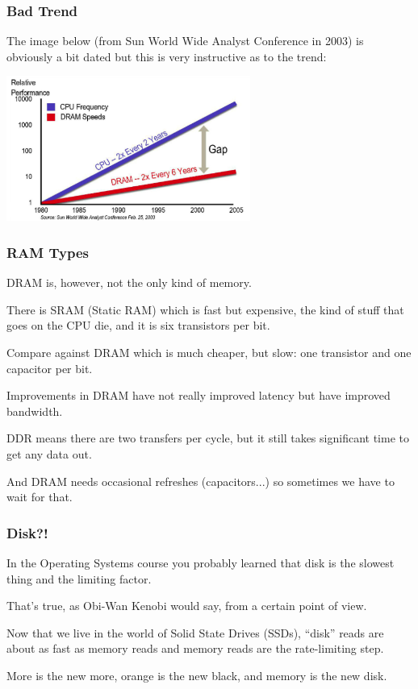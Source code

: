 \begin{frame}
\frametitle{Bad Trend}

The image below (from Sun World Wide Analyst Conference in 2003) is obviously a bit dated but this is very instructive as to the trend:
\begin{center}
\includegraphics[width=0.6\textwidth]{images/ram-vs-cpu.png}
\end{center}

\end{frame}



\begin{frame}
\frametitle{RAM Types}

DRAM is, however, not the only kind of memory. 

There is SRAM (Static RAM) which is fast but expensive, the kind of stuff that goes on the CPU die, and it is six transistors per bit. 

Compare against DRAM which is much cheaper, but slow: one transistor and one capacitor per bit. 

Improvements in DRAM have not really improved latency but have improved bandwidth. 

DDR means there are two transfers per cycle, but it still takes significant time to get any data out. 

And DRAM needs occasional refreshes (capacitors...) so sometimes we have to wait for that.

\end{frame}



\begin{frame}
\frametitle{Disk?!}

In the Operating Systems course you probably learned that disk is the slowest thing and the limiting factor. 

That's true, as Obi-Wan Kenobi would say, from a certain point of view. 

Now that we live in the world of Solid State Drives (SSDs), ``disk'' reads are about as fast as memory reads and memory reads are the rate-limiting step. 

More is the new more, orange is the new black, and memory is the new disk.

\end{frame}



